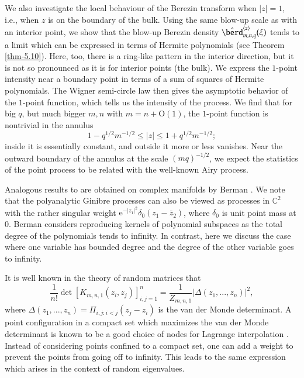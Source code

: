 \documentclass{birkart}
\theoremstyle{definition}
\theoremstyle{remark}
\numberwithin{equation}{section}
\numberwithin{figure}{section}
\newcommand{\e}{\mathrm e}
\newcommand{\1}{{\mathbf 1}}
\newcommand{\Rpar}{q}
\newcommand{\Ordo}{\mathrm{O}}
\begin{document}
We also investigate the local behaviour of the Berezin transform when 
$|z|=1$, i.e., when $z$ is on the boundary of the bulk. Using the same blow-up 
scale as with an interior point, we show that the blow-up Berezin density
$\hat{\berd}^{\langle z\rangle}_{m,n,\Rpar}(\xi)$ tends to a limit which can 
be expressed in terms of Hermite polynomials (see Theorem 
\ref{thm-5.10}). Here, too, there is a ring-like pattern in the interior 
direction, but it is not so pronounced as it is for interior points (the bulk).
We express the $1$-point intensity near a boundary point in terms of 
a sum of squares of Hermite polynomials. The Wigner semi-circle law 
then gives the asymptotic behavior of the $1$-point function, which tells us
the intensity of the process. We find that for big $q$, but much bigger
$m,n$ with $m=n+\Ordo(1)$, the $1$-point function is nontrivial in the annulus 
\[
1-q^{1/2}m^{-1/2}\le|z|\le1+q^{1/2}m^{-1/2};
\]
inside it is essentially constant, and outside it more or less vanishes.
Near the outward boundary of the annulus at the scale $(mq)^{-1/2}$,
we expect the statistics of the point process to be related with the 
well-known Airy process.
\medskip
 
 Analogous results to 
\cite{ahm1} are obtained on complex manifolds by Berman \cite{berman1}. 
We note that the polyanalytic Ginibre processes can also be viewed as 
processes in $\mathbb{C}^2$ with the rather singular weight  
$\e^{-|z_1|^2}\delta_0(z_1-\bar z_2)$, where $\delta_0$ is unit point mass 
at $0$. Berman considers reproducing kernels of polynomial subspaces as the 
total degree of the polynomials tends to infinity. In contrast, here we 
discuss the case where one variable has bounded degree and the degree of 
the other variable goes to infinity. 
\medskip

It is well known in the theory of random matrices that 
\[ 
\frac{1}{n!} \det[K_{m,n,1}(z_i, z_j)]_{i,j=1}^n 
= \frac{1}{Z_{m,n,1}} |\Delta(z_1,...,z_n)|^2, 
\]
where $\Delta(z_1,...,z_n)= \Pi_{i,j:i<j} (z_j-z_i)$ is the van der Monde  
determinant. 
A point configuration in a compact set which maximizes the van der Monde 
determinant is known to 
 be a good 
choice of nodes for Lagrange interpolation \cite{st}. Instead of considering 
points confined to a compact set, one can add a weight to prevent the points 
from going off to infinity. This leads to the same expression which arises 
in the context of random eigenvalues. 
\end{document}
